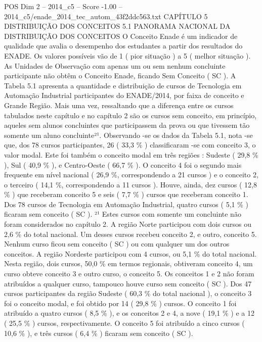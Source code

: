 \begin{textsample}{POS Dim 2 – 2014\_c5 – Score -1.00 – 2014\_c5/enade\_2014\_tec\_autom\_43f2ddc563.txt}  \label{ex:f2_pos_306}
CAPÍTULO 5 DISTRIBUIÇÃO DOS CONCEITOS 5.1 PANORAMA NACIONAL DA DISTRIBUIÇÃO DOS CONCEITOS O Conceito Enade é um indicador de qualidade que avalia o desempenho dos estudantes a partir dos resultados do ENADE.
Os valores possíveis vão de 1 ( pior situação ) a 5 ( melhor situação ).
As Unidades de Observação com apenas um ou sem nenhum concluinte participante não obtêm o Conceito Enade, ficando Sem Conceito ( SC ).
A Tabela 5.1 apresenta a quantidade e distribuição de cursos de Tecnologia em Automação Industrial participantes do ENADE/2014, por faixa de conceito e Grande Região.
Mais uma vez, ressaltando que a diferença entre os cursos tabulados neste capítulo e no capítulo 2 são os cursos sem conceito, em princípio, aqueles sem alunos concluintes que participassem da prova ou que tivessem tão somente um aluno concluinte²¹.
Observando -se os dados da Tabela 5.1, nota -se que, dos 78 cursos participantes, 26 ( 33,3 \% ) classificaram -se com conceito 3, o valor modal.
Este foi também o conceito modal em três regiões : Sudeste ( 29,8 \% ), Sul ( 40,9 \% ), e Centro-Oeste ( 66,7 \% ).
O conceito 4 foi o segundo mais frequente em nível nacional ( 26,9 \%, correspondendo a 21 cursos ) e o conceito 2, o terceiro ( 14,1 \%, correspondendo a 11 cursos ).
Houve, ainda, dez cursos ( 12,8 \% ) que receberam conceito 5 e seis ( 7,7 \% ) cursos que receberam conceito 1.
Dos 78 cursos de Tecnologia em Automação Industrial, quatro cursos ( 5,1 \% ) ficaram sem conceito ( SC ). ²¹ Estes cursos com somente um concluinte não foram considerados no capítulo 2.
A região Norte participou com dois cursos ou 2,6 \% do total nacional.
Um desses cursos recebeu conceito 2, e outro, conceito 5.
Nenhum curso ficou sem conceito ( SC ) ou com qualquer um dos outros conceitos.
A região Nordeste participou com 4 cursos, ou 5,1 \% do total nacional.
Nesta região, dois cursos, 50,0 \% em termos regionais, obtiveram conceito 4, um curso obteve conceito 3 e outro curso, o conceito 5.
Os conceitos 1 e 2 não foram atribuídos a qualquer curso, tampouco houve curso sem conceito ( SC ).
Dos 47 cursos participantes da região Sudeste ( 60,3 \% do total nacional ), o conceito 3 foi o conceito modal, e foi obtido por 14 ( 29,8 \% ) cursos.
O conceito 1 foi atribuído a quatro cursos ( 8,5 \% ), e os conceitos 2 e 4, a nove ( 19,1 \% ) e a 12 ( 25,5 \% ) cursos, respectivamente.
O conceito 5 foi atribuído a cinco cursos ( 10,6 \% ), e três cursos ( 6,4 \% ) ficaram sem conceito ( SC ).

\end{textsample}
